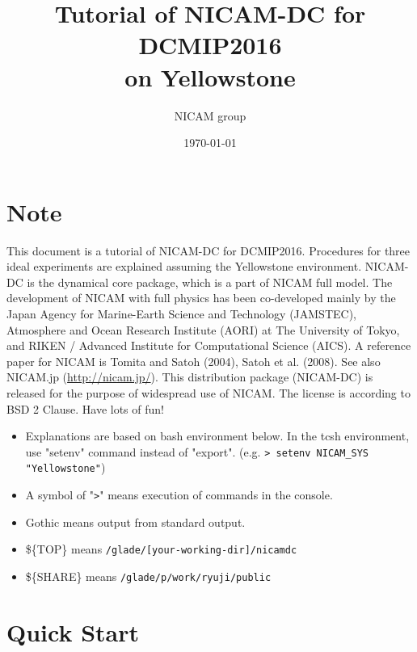 \documentclass[a4paper]{article}
\title{{\Huge Tutorial of NICAM-DC for DCMIP2016\\
              on Yellowstone \\
        \vspace{1cm}{\Large Version 2.0} }}
\author{\Large NICAM group}
\date{\today}
\begin{document}
\maketitle

\vspace{5cm}

\section*{Note}
 This document is a tutorial of NICAM-DC for DCMIP2016. Procedures for three
 ideal experiments are explained assuming the Yellowstone environment.
 NICAM-DC is the dynamical core package, which is a part of NICAM full model.
 The development of NICAM with full physics has been co-developed mainly by
 the Japan Agency for Marine-Earth Science and Technology (JAMSTEC), Atmosphere
 and Ocean Research Institute (AORI) at The University of Tokyo, and RIKEN / Advanced
 Institute for Computational Science (AICS). A reference paper for NICAM is
 Tomita and Satoh (2004), Satoh et al. (2008). See also NICAM.jp (\url{http://nicam.jp/}).
 This distribution package (NICAM-DC) is released for the purpose of widespread
 use of NICAM. The license is according to BSD 2 Clause. Have lots of fun!

 \hrulefill
 \begin{itemize}
   \item Explanations are based on bash environment below.
         In the tcsh environment, use "setenv" command instead of "export".
         (e.g. \verb|> setenv NICAM_SYS "Yellowstone"|)
   \item A symbol of "\verb|>|" means execution of commands in the console.
   \item Gothic means output from standard output.
   \item \$\{TOP\}   means \verb|/glade/[your-working-dir]/nicamdc|
   \item \$\{SHARE\} means \verb|/glade/p/work/ryuji/public|
 \end{itemize}



\clearpage

\tableofcontents

\clearpage


\section{Quick Start}
\end{document}
